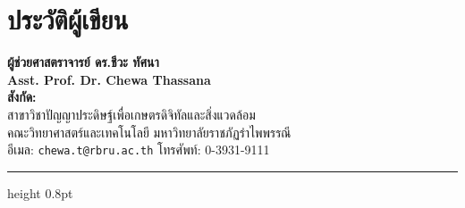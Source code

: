 
\chapter*{ประวัติผู้เขียน}

\vspace{10pt}

\noindent
\begin{minipage}[c]{0.26\textwidth}
    \centering
\end{minipage}%
\hfill
\begin{minipage}[c]{0.70\textwidth}
    {\fontsize{15}{19}\selectfont\bfseries\color{teal!70!black} ผู้ช่วยศาสตราจารย์ ดร.ชีวะ ทัศนา}\\[4pt]
    {\fontsize{10}{13}\selectfont\bfseries Asst. Prof. Dr. Chewa Thassana}\\[6pt]
    {\fontsize{9.5}{13}\selectfont
    \textbf{สังกัด:}\\
    สาขาวิชาปัญญาประดิษฐ์เพื่อเกษตรดิจิทัลและสิ่งแวดล้อม\\
    คณะวิทยาศาสตร์และเทคโนโลยี มหาวิทยาลัยราชภัฏรำไพพรรณี\\
    อีเมล: \texttt{chewa.t@rbru.ac.th} \enspace\textbar\enspace โทรศัพท์: 0-3931-9111
    }
\end{minipage}

\vspace{16pt}
{\color{gray!40}\hrule height 0.8pt}
\vspace{16pt}

